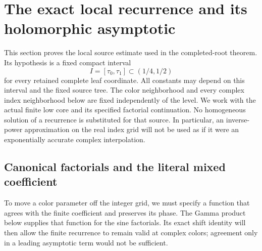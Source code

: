 \section{The exact local recurrence and its holomorphic asymptotic}
\label{app:selected-source}

This section proves the local source estimate used in the completed-root
theorem. Its hypothesis is a fixed compact interval
\begin{equation}\label{eq:b1-high-interval}
 I=[\tau_0,\tau_1]\subset(1/4,1/2)
\end{equation}
for every retained complete leaf coordinate. All constants may depend on
this interval and the fixed source tree. The color neighborhood and every
complex index neighborhood below are fixed independently of the level.
We work with the actual finite low core and its specified factorial
continuation. No homogeneous solution of a recurrence is substituted for
that source. In particular, an inverse-power approximation on the real
index grid will not be used as if it were an exponentially accurate
complex interpolation.

\subsection{Canonical factorials and the literal mixed coefficient}

To move a color parameter off the integer grid, we must specify a function that agrees with the finite coefficient and preserves its phase. The Gamma product below supplies that function for the sine factorials. Its exact shift identity will then allow the finite recurrence to remain valid at complex colors; agreement only in a leading asymptotic term would not be sufficient.

